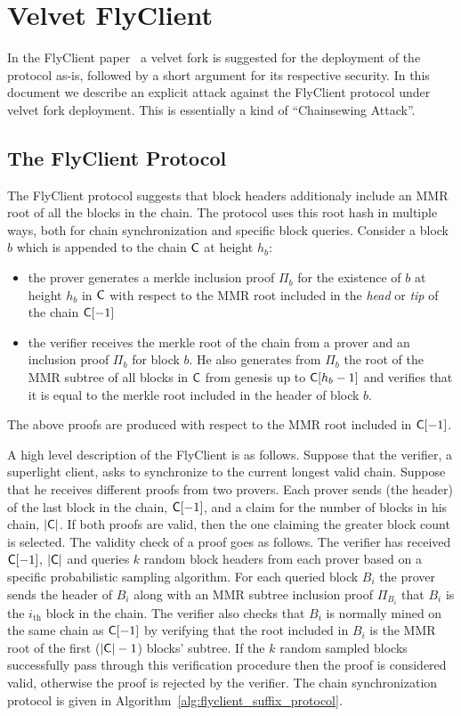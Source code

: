 \section{Velvet FlyClient}
\label{sec:flyclient}
In the FlyClient paper~\cite{flyclient} a velvet fork is suggested for the deployment of the protocol as-is, 
followed by a short argument for its respective security. In this document we describe an explicit attack against 
the FlyClient protocol under velvet fork deployment. 
This is essentially a kind of ``Chainsewing Attack''.

\subsection{The FlyClient Protocol}
	The FlyClient protocol suggests that block headers additionaly include an MMR root of all the blocks in the chain. The protocol uses this root hash in multiple ways, both for chain synchronization and specific block queries. Consider a block $b$ which is appended to the chain $\mathsf{C}$ at height $h_b$: 
	\begin{itemize}
		\item the prover generates a merkle inclusion proof $\Pi_b$ for the existence of $b$ at height $h_b$ in $\mathsf{C}$ with respect to the MMR root included in the \emph{head} or \emph{tip} of the chain $\mathsf{C}[-1]$
		\item the verifier receives the merkle root of the chain from a prover and an inclusion proof $\Pi_b$ for block $b$. He also generates from $\Pi_b$ the root of the MMR subtree of all blocks in $\mathsf{C}$ from genesis up to $\mathsf{C}[h_b - 1]$ and verifies that it is equal to the merkle root included in the header of block $b$.
	\end{itemize}
	The above proofs are produced with respect to the MMR root included in $\mathsf{C}[-1]$.

	\vspace{2mm}
	\noindent
	A high level description of the FlyClient is as follows. Suppose that  the verifier, a superlight client, asks to synchronize to the current longest valid chain.  Suppose that he receives different proofs from two provers. Each prover sends (the header) of the last block in the chain, $\mathsf{C}[-1]$, and a claim for the number of blocks in his chain, $\lvert \mathsf{C} \rvert$. If both proofs are valid, then the one claiming the greater block count is selected. The validity check of a proof goes as follows. 
	The verifier has received $\mathsf{C}[-1]$, $\lvert \mathsf{C} \rvert$ and queries $k$ random block headers from each prover based on a specific probabilistic sampling algorithm. For each queried block $B_i$ the prover sends the header of $B_i$ along with an MMR subtree inclusion proof $\Pi_{B_i}$ that $B_i$ is the $i_\text{th}$ block in the chain. The verifier also checks that $B_i$ is normally mined on the same chain as $\mathsf{C}[-1]$ by verifying that the root included in $B_i$ is the MMR root of the first ($\lvert \mathsf{C} \rvert - 1$) blocks' subtree. If the $k$ random sampled blocks successfully pass through this verification procedure then the proof is considered valid, otherwise the proof is rejected by the verifier. 
	The chain synchronization protocol is given in Algorithm~\ref{alg:flyclient_suffix_protocol}.

